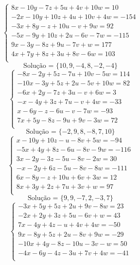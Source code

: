 \documentclass[12pt,oneside,a4paper]{article}
\begin{document}
\vspace{\baselineskip}
\begin{equation*}
\begin{cases}
8x-10y-7z+5u+4v+10w=10 \\
-2x-10y+10z+4u+10v+4w=-154 \\
-3x+8y-z+10u-v+9w=92 \\
-5x-9y+10z+2u-6v-7w=-115 \\
9x-3y-8z+9u-7v+w=177 \\
4x+7y+8z+3u+8v-6w=103 \\
\end{cases}
\end{equation*}
\begin{equation*}
\text{Solução = }\{10,9,-4,8,-2,-4\}
\end{equation*}
\vspace{\baselineskip}
\begin{equation*}
\begin{cases}
-8x-2y+5z-7u+10v-5w=114 \\
-10x-3y+5z+2u-5v+10w=82 \\
-6x+2y-7z+3u-v+6w=3 \\
-x-4y+3z+7u-v+4w=-33 \\
x-6y-z-6u-v-7w=-93 \\
7x+5y-8z-9u+9v-3w=72 \\
\end{cases}
\end{equation*}
\begin{equation*}
\text{Solução = }\{-2,9,8,-8,7,10\}
\end{equation*}
\vspace{\baselineskip}
\begin{equation*}
\begin{cases}
x-10y+10z-u-8v+5w=-94 \\
-5x+4y+8z-6u-8v-9w=-116 \\
3x-2y-3z-5u-8v-2w=30 \\
-x-2y+6z-5u-8v-8w=-111 \\
6x-8y-z+10u+6v+3w=12 \\
8x+3y+2z+7u+3v+w=97 \\
\end{cases}
\end{equation*}
\begin{equation*}
\text{Solução = }\{9,9,-7,2,-3,7\}
\end{equation*}
\vspace{\baselineskip}
\begin{equation*}
\begin{cases}
-3x+5y+5z+2u+9v-8w=23 \\
-2x+2y+3z+5u-6v+w=43 \\
7x-4y+4z-u+4v+4w=-50 \\
9x-8y+5z+2u-8v+9w=-29 \\
-10x+4y-8z-10u-3v-w=50 \\
-4x-6y-4z-3u+7v+4w=-41 \\
\end{cases}
\end{equation*}
\end{document}
